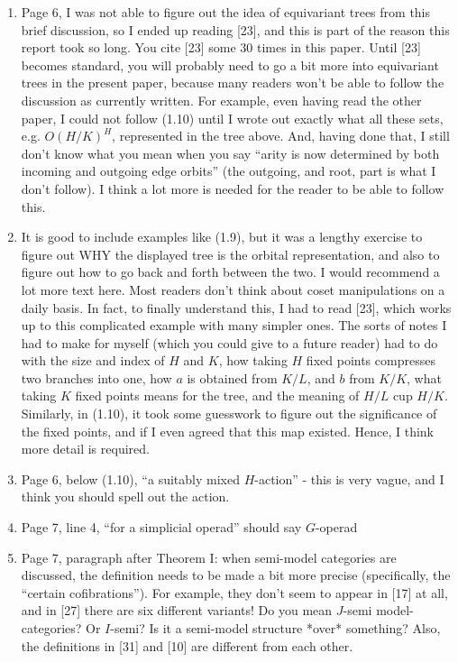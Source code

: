 \documentclass{article}
\begin{document}
\begin{enumerate}
	\item
	Page 6, I was not able to figure out the idea of equivariant trees from this brief discussion, so I ended up reading [23], and this is part of the reason this report took so long. You cite [23] some 30 times in this paper. Until [23] becomes standard, you will probably need to go a bit more into equivariant trees in the present paper, because many readers won't be able to follow the discussion as currently written. For example, even having read the other paper, I could not follow (1.10) until I wrote out exactly what all these sets, e.g. $O(H/K)^H$, represented in the tree above. And, having done that, I still don't know what you mean when you say ``arity is now determined by both incoming and outgoing edge orbits'' (the outgoing, and root, part is what I don't follow). I think a lot more is needed for the reader to be able to follow this.
	
	\item 
	It is good to include examples like (1.9), but it was a lengthy exercise to figure out WHY the displayed tree is the orbital representation, and also to figure out how to go back and forth between the two. I would recommend a lot more text here. Most readers don't think about coset manipulations on a daily basis. In fact, to finally understand this, I had to read [23], which works up to this complicated example with many simpler ones. The sorts of notes I had to make for myself (which you could give to a future reader) had to do with the size and index of $H$ and $K$, how taking $H$ fixed points compresses two branches into one, how $a$ is obtained from $K/L$, and $b$ from $K/K$, what taking $K$ fixed points means for the tree, and the meaning of $H/L$ cup $H/K$. Similarly, in (1.10), it took some guesswork to figure out the significance of the fixed points, and if I even agreed that this map existed. Hence, I think more detail is required.
	
	\item
	Page 6, below (1.10), ``a suitably mixed $H$-action'' - this is very vague, and I think you should spell out the action.
	
	
	\item
	Page 7, line 4, ``for a simplicial operad'' should say $G$-operad
	
	\item
	Page 7, paragraph after Theorem I: when semi-model categories are discussed, the definition needs to be made a bit more precise (specifically, the ``certain cofibrations''). For example, they don't seem to appear in [17] at all, and in [27] there are six different variants! Do you mean $J$-semi model-categories? Or $I$-semi? Is it a semi-model structure *over* something? Also, the definitions in [31] and [10] are different from each other.
	

\end{enumerate}
\end{document}
